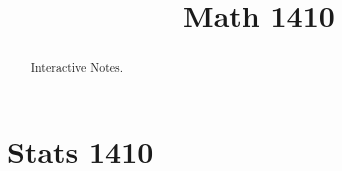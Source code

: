 \documentclass{xourse}
\author{ }
\title{Math 1410}
\begin{document}
\begin{abstract}
    Interactive Notes.
\end{abstract}
\maketitle
\part{Stats 1410}
\chapterstyle
{}
\end{document}
